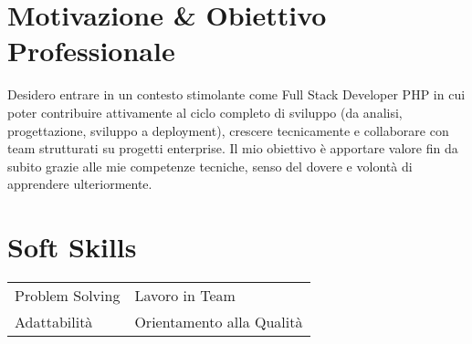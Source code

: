 \documentclass[a4paper,12pt]{article}
\begin{document}
\section{Motivazione \& Obiettivo Professionale}

Desidero entrare in un contesto stimolante come Full Stack Developer PHP in cui poter contribuire attivamente al ciclo completo di sviluppo (da analisi, progettazione, sviluppo a deployment), crescere tecnicamente e collaborare con team strutturati su progetti enterprise. Il mio obiettivo è apportare valore fin da subito grazie alle mie competenze tecniche, senso del dovere e volontà di apprendere ulteriormente.

\section{Soft Skills}
\begin{tabularx}{\linewidth}{@{}l X@{}}
Problem Solving & Lavoro in Team \\
Adattabilità & Orientamento alla Qualità \\
\end{tabularx}

\vfill
{}
\end{document}
